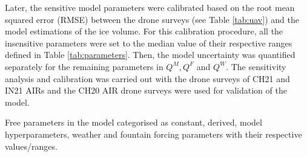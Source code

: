 \documentclass[utf8]{frontiersSCNS}
\begin{document}
Later, the sensitive model parameters were calibrated based on the root mean squared error (RMSE) between the
drone surveys (see Table \ref{tab:uav}) and the model estimations of the ice volume. For this calibration
procedure, all the insensitive parameters were set to the median value of their respective ranges defined in
Table \ref{tab:parameters}. Then, the model uncertainty was quantified separately for the remaining parameters
in $Q^M, Q^F$ and $Q^W$. The sensitivity analysis and calibration was carried out with the drone surveys of CH21
and IN21 AIRs and the CH20 AIR drone surveys were used for validation of the model.

\begin{table}[h!]
  \caption{Free parameters in the model categorised as constant, derived, model hyperparameters, weather and
  fountain forcing parameters with their respective values/ranges.}


\end{table}
\end{document}
